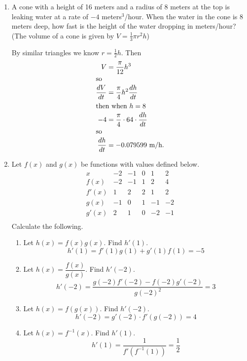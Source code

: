 \documentclass[11pt]{article}
\begin{document}
\begin{enumerate}
  \newpage

\item A cone with a height of 16 meters and a radius of 8 meters at
  the top is leaking water at a rate of $-4$ meters$^3$/hour.  When
  the water in the cone is 8 meters deep, how fast is the height of
  the water dropping in meters/hour? (The volume of a cone is given by
  $V=\frac{1}{3}\pi r^2 h$)

  \vfill

  By similar triangles we know $r=\frac{1}{2}h$.  Then
  \begin{align*}
    V &=\frac{\pi}{12}h^3 \\
    \intertext{so}
    \frac{dV}{dt} &=\frac{\pi}{4}h^2\frac{dh}{dt}\\
    \intertext{then when $h=8$}
    -4 &=\frac{\pi}{4}\cdot 64 \cdot \frac{dh}{dt}\\
    \intertext{so}
    \frac{dh}{dt} &= -0.079599 \text{ m/h}.
  \end{align*}

  \vfill

  \newpage

\item Let $f(x)$ and $g(x)$ be functions with values defined below.
  \[
  \begin{array}{c||c|c|c|c|c}
    x & -2 & -1 & 0 & 1 & 2\\
    \hline\hline
    f(x) & -2 & -1 & 1 & 2 & 4\\ \hline
    f'(x) & 1 & 2 & 2 & 1 & 2\\ \hline
    g(x) & -1 & 0 & 1 & -1 & -2\\ \hline
    g'(x) & 2 & 1 & 0 & -2 & -1\\ 
  \end{array}
  \]
  Calculate the following.
  \begin{enumerate}
  \item Let $h(x)=f(x)g(x)$.  Find $h'(1)$.
    \vfill
    \[
    h'(1)=f'(1)g(1)+g'(1)f(1)= -5
    \]
    \vfill
  \item Let $h(x)=\dfrac{f(x)}{g(x)}$.  Find $h'(-2)$.
    \vfill
    \[
    h'(-2)=\frac{g(-2)f'(-2)-f(-2)g'(-2)}{g(-2)^2}= 3
    \]
    \vfill
  \item Let $h(x)=f(g(x))$.  Find $h'(-2)$.
    \vfill
    \[
    h'(-2)=g'(-2)\cdot f'(g(-2)) = 4
    \]
    \vfill
  \item Let $h(x)=f^{-1}(x)$.  Find $h'(1)$.
    \vfill
    \[
    h'(1)=\frac{1}{f'(f^{-1}(1))}=\frac{1}{2}
    \]
    \vfill
  \end{enumerate}


\end{enumerate}
\end{document}
